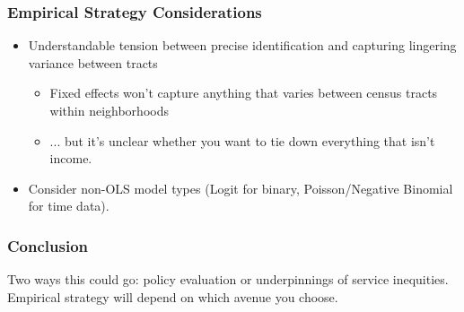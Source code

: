 \documentclass{beamer}
\begin{document}
\begin{frame}
\frametitle{Empirical Strategy Considerations}
\begin{itemize}
	\item Understandable tension between precise identification and capturing lingering variance between tracts
	\pause
	\begin{itemize}
		\item Fixed effects won't capture anything that varies between census tracts within neighborhoods
		\pause
		\item ... but it's unclear whether you want to tie down everything that isn't income.
	\end{itemize}
	\pause
	\item Consider non-OLS model types (Logit for binary, Poisson/Negative Binomial for time data).
\end{itemize}
\end{frame}

\begin{frame}
\frametitle{Conclusion}
Two ways this could go: policy evaluation or underpinnings of service inequities. Empirical strategy will depend on which avenue you choose.
\end{frame}
\end{document}
